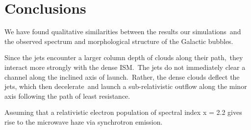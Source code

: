 \documentclass[twocolumn]{aastex631}
\begin{document}
%
%
%
%
%



\section{Conclusions}
\label{Conclusions}
We have found qualitative similarities between the results our simulations\
and the observed spectrum and morphological structure of the Galactic bubbles.


Since the jets encounter a larger column depth of clouds along their path,\
they interact more strongly with the dense ISM.\
The jets do not immediately clear a channel along the inclined axis of launch.\
Rather, the dense clouds deflect the jets, which then decelerate\
and launch a sub-relativistic outflow along the minor axis following the path of least resistance.

Assuming that a relativistic electron population of spectral
index x = 2.2 gives rise to the microwave haze via synchrotron
emission.
\end{document}
